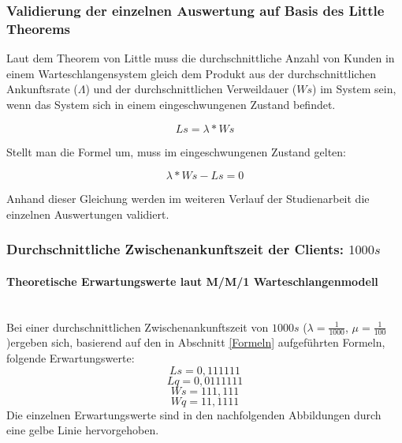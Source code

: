\subsubsection{Validierung der einzelnen Auswertung auf Basis des Little Theorems}
Laut dem Theorem von Little muss die durchschnittliche Anzahl von Kunden in einem Warteschlangensystem gleich dem Produkt aus der durchschnittlichen Ankunftsrate ($\Lambda$) und der durchschnittlichen Verweildauer ($Ws$) im System sein, wenn das System sich in einem eingeschwungenen Zustand befindet.

\begin{equation}
Ls=\lambda*Ws
\end{equation}

Stellt man die Formel um, muss im eingeschwungenen Zustand gelten:

\begin{equation}
\label{eq:little}
\lambda*Ws - Ls=0
\end{equation}

Anhand dieser Gleichung werden im weiteren Verlauf der Studienarbeit die einzelnen Auswertungen validiert.

\subsubsection{Durchschnittliche Zwischenankunftszeit der Clients: $1000s$}

\paragraph{Theoretische Erwartungswerte laut M/M/1 Warteschlangenmodell}
\\
Bei einer durchschnittlichen Zwischenankunftszeit von $1000s$ ($\lambda=\frac{1}{1000}$, $\mu=\frac{1}{100}$)ergeben sich, basierend auf den in Abschnitt \ref{Formeln} aufgeführten Formeln, folgende Erwartungswerte:
\begin{equation}
Ls=0,111111
\end{equation}
\begin{equation}
Lq=0,0111111
\end{equation}
\begin{equation}
Ws=111,111
\end{equation}
\begin{equation}
Wq=11,1111
\end{equation}
Die einzelnen Erwartungswerte sind in den nachfolgenden Abbildungen durch eine gelbe Linie hervorgehoben.

